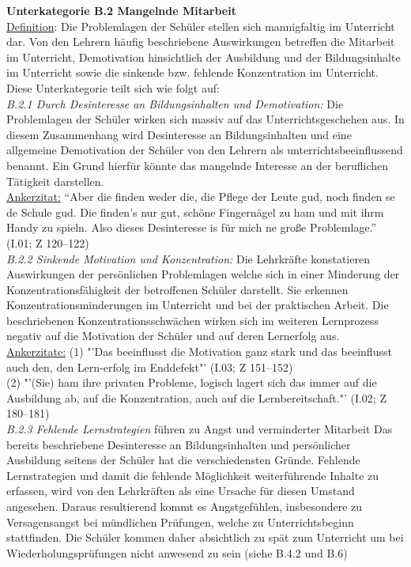 \textbf{Unterkategorie B.2 Mangelnde Mitarbeit}\\
\underline{Definition}: Die Problemlagen der Schüler stellen sich mannigfaltig im Unterricht dar. Von den Lehrern häufig beschriebene Auswirkungen betreffen die Mitarbeit im Unterricht, Demotivation hinsichtlich der Ausbildung und der Bildungsinhalte im Unterricht sowie die sinkende bzw. fehlende Konzentration im Unterricht. Diese Unterkategorie teilt sich wie folgt auf:\\
\textit{B.2.1 Durch Desinteresse an Bildungsinhalten und Demotivation:} Die Problemlagen der Schüler wirken sich massiv auf das Unterrichtsgeschehen aus. In diesem Zusammenhang wird Desinteresse an Bildungsinhalten und eine allgemeine Demotivation der Schüler von den Lehrern als unterrichtsbeeinflussend benannt. Ein Grund hierfür könnte das mangelnde Interesse an der beruflichen Tätigkeit darstellen.\\
\underline{Ankerzitat:} "`Aber die finden weder die, die Pflege der Leute gud, noch finden se de Schule gud. Die finden's nur gut, schöne Fingernägel zu ham und mit ihrm Handy zu spieln. Also dieses Desinteresse is für mich ne große Problemlage."' (I.01; Z 120--122)\\
\textit{B.2.2  Sinkende Motivation und Konzentration:} Die Lehrkräfte konstatieren Auswirkungen der persönlichen Problemlagen welche sich in einer Minderung der Konzentrationsfähigkeit der betroffenen Schüler darstellt. Sie erkennen Konzentrationsminderungen im Unterricht und bei der praktischen Arbeit. Die beschriebenen Konzentrationsschwächen wirken sich im weiteren Lernprozess negativ auf die Motivation der Schüler und auf deren Lernerfolg aus.\\
\underline{Ankerzitate:} (1) "'Das beeinflusst die Motivation ganz stark und das beeinflusst auch den, den Lern-erfolg im Enddefekt"' (I.03; Z 151--152)\\ (2) "'(Sie) ham ihre privaten Probleme, logisch lagert sich das immer auf die Ausbildung ab, auf die Konzentration, auch auf die Lernbereitschaft."' (I.02; Z 180--181)\\
\textit{B.2.3 Fehlende Lernstrategien} führen zu Angst und verminderter Mitarbeit Das bereits beschriebene Desinteresse an Bildungsinhalten und persönlicher Ausbildung seitens der Schüler hat die verschiedensten Gründe. Fehlende Lernstrategien und damit die fehlende Möglichkeit weiterführende Inhalte zu erfassen, wird von den Lehrkräften als eine Ursache für diesen Umstand angesehen. Daraus resultierend kommt es Angstgefühlen, insbesondere zu Versagensangst bei mündlichen Prüfungen, welche zu Unterrichtsbeginn stattfinden. Die Schüler kommen daher absichtlich zu spät zum Unterricht um bei Wiederholungsprüfungen nicht anwesend zu sein (siehe B.4.2 und B.6)\\
